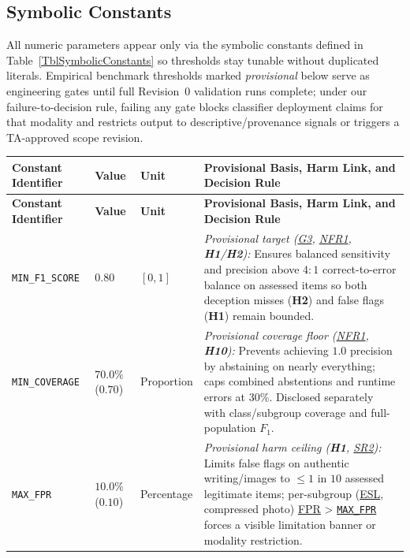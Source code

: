 \documentclass[11pt]{article}
\newcommand{\MaxFPR}{\hyperref[const:MAX_FPR]{\texttt{MAX\_\allowbreak{}FPR}}}
\newcommand{\ESL}{\hyperlink{acr-esl}{ESL}}
\newcommand{\FPR}{\hyperlink{acr-fpr}{FPR}}
\begin{document}
\subsection*{Symbolic Constants}
\label{subsec:symbolic-constants}

All numeric parameters appear only via the symbolic constants defined in Table~\ref{TblSymbolicConstants} so thresholds stay tunable without duplicated literals. Empirical benchmark thresholds marked \emph{provisional} below serve as engineering gates until full Revision~0 validation runs complete; under our failure-to-decision rule, failing any gate blocks classifier deployment claims for that modality and restricts output to descriptive/provenance signals or triggers a TA-approved scope revision.

{\footnotesize
\renewcommand{\arraystretch}{1.05}
\begin{tabularx}{\textwidth}{P{4.4cm} P{1.7cm} P{1.8cm} Y}
\caption{Symbolic Constants and Substantive Engineering Rationale} \label{TblSymbolicConstants}\\
\toprule
\textbf{Constant Identifier} & \textbf{Value} & \textbf{Unit} & \textbf{Provisional Basis, Harm Link, and Decision Rule}\\
\midrule
\endfirsthead
\toprule
\textbf{Constant Identifier} & \textbf{Value} & \textbf{Unit} & \textbf{Provisional Basis, Harm Link, and Decision Rule}\\
\midrule
\endhead
\bottomrule
\endfoot
{}\label{const:MIN_F1_SCORE}\texttt{MIN\_\allowbreak{}F1\_\allowbreak{}SCORE} & $0.80$ & $[0,1]$ & \emph{Provisional target (\hyperref[G3]{G3}, \hyperref[NFR1]{NFR1}, \textbf{H1}/\textbf{H2}):} Ensures balanced sensitivity and precision above $4{:}1$ correct-to-error balance on assessed items so both deception misses (\textbf{H2}) and false flags (\textbf{H1}) remain bounded.\\
\addlinespace
{}\label{const:MIN_COVERAGE}\texttt{MIN\_\allowbreak{}COVERAGE} & $70.0\%$ ($0.70$) & Proportion & \emph{Provisional coverage floor (\hyperref[NFR1]{NFR1}, \textbf{H10}):} Prevents achieving $1.0$ precision by abstaining on nearly everything; caps combined abstentions and runtime errors at $30\%$. Disclosed separately with class/subgroup coverage and full-population $F_1$.\\
\addlinespace
{}\label{const:MAX_FPR}\texttt{MAX\_\allowbreak{}FPR} & $10.0\%$ ($0.10$) & Percentage & \emph{Provisional harm ceiling (\textbf{H1}, \hyperref[SR2]{SR2}):} Limits false flags on authentic writing/images to $\le 1$ in $10$ assessed legitimate items; per-subgroup (\ESL{}, compressed photo) \FPR{} > \MaxFPR{} forces a visible limitation banner or modality restriction.\\

\end{tabularx}}
\end{document}
